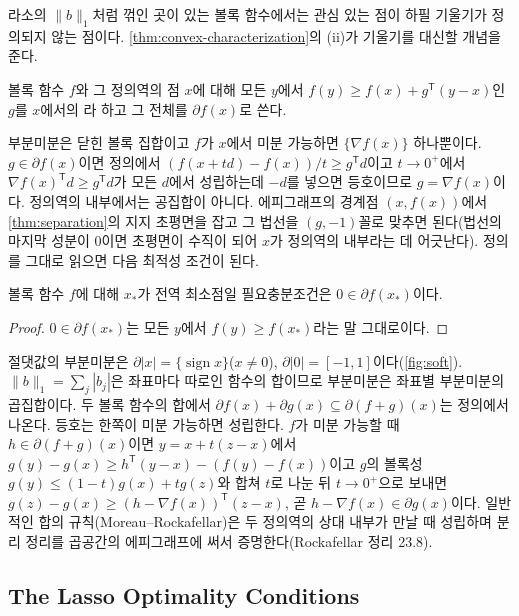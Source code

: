 라소의 $\|b\|_1$처럼 꺾인 곳이 있는 볼록 함수에서는 관심 있는 점이 하필 기울기가 정의되지 않는 점이다. \cref{thm:convex-characterization}의 (ii)가 기울기를 대신할 개념을 준다.

\begin{definition}
\label{def:subgradient}
볼록 함수 $f$와 그 정의역의 점 $x$에 대해 모든 $y$에서 $f(y)\ge f(x)+g^{\mathsf T}(y-x)$인 $g$를 $x$에서의 라 하고 그 전체를  $\partial f(x)$로 쓴다.
\end{definition}

부분미분은 닫힌 볼록 집합이고 $f$가 $x$에서 미분 가능하면 $\{\nabla f(x)\}$ 하나뿐이다. $g\in\partial f(x)$이면 정의에서 $(f(x+td)-f(x))/t\ge g^{\mathsf T}d$이고 $t\to0^+$에서 $\nabla f(x)^{\mathsf T}d\ge g^{\mathsf T}d$가 모든 $d$에서 성립하는데 $-d$를 넣으면 등호이므로 $g=\nabla f(x)$이다. 정의역의 내부에서는 공집합이 아니다. 에피그래프의 경계점 $(x,f(x))$에서 \cref{thm:separation}의 지지 초평면을 잡고 그 법선을 $(g,-1)$꼴로 맞추면 된다(법선의 마지막 성분이 $0$이면 초평면이 수직이 되어 $x$가 정의역의 내부라는 데 어긋난다). 정의를 그대로 읽으면 다음 최적성 조건이 된다.

\begin{proposition}
\label{prop:subgradient-optimality}
볼록 함수 $f$에 대해 $x_\ast$가 전역 최소점일 필요충분조건은 $0\in\partial f(x_\ast)$이다.
\end{proposition}

\begin{proof}
$0\in\partial f(x_\ast)$는 모든 $y$에서 $f(y)\ge f(x_\ast)$라는 말 그대로이다.
\end{proof}

절댓값의 부분미분은 $\partial|x|=\{\operatorname{sign}x\}$($x\ne0$), $\partial|0|=[-1,1]$이다(\cref{fig:soft}). $\|b\|_1=\sum_j|b_j|$은 좌표마다 따로인 함수의 합이므로 부분미분은 좌표별 부분미분의 곱집합이다. 두 볼록 함수의 합에서 $\partial f(x)+\partial g(x)\subseteq\partial(f+g)(x)$는 정의에서 나온다. 등호는 한쪽이 미분 가능하면 성립한다. $f$가 미분 가능할 때 $h\in\partial(f+g)(x)$이면 $y=x+t(z-x)$에서 $g(y)-g(x)\ge h^{\mathsf T}(y-x)-(f(y)-f(x))$이고 $g$의 볼록성 $g(y)\le(1-t)g(x)+tg(z)$와 합쳐 $t$로 나눈 뒤 $t\to0^+$으로 보내면 $g(z)-g(x)\ge(h-\nabla f(x))^{\mathsf T}(z-x)$, 곧 $h-\nabla f(x)\in\partial g(x)$이다. 일반적인 합의 규칙(Moreau--Rockafellar)은 두 정의역의 상대 내부가 만날 때 성립하며 분리 정리를 곱공간의 에피그래프에 써서 증명한다(Rockafellar\cite{rockafellar1970} 정리 23.8).

\subsection{The Lasso Optimality Conditions}

